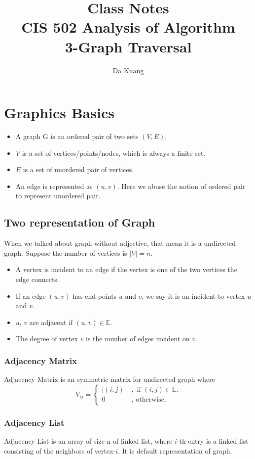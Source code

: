 \documentclass[en,hazy,blue,screen,14pt]{elegantnote}
\title{Class Notes\\CIS 502 Analysis of Algorithm\\3-Graph Traversal}
\author{Da Kuang}
\institute{University of Pennsylvania}
\date{}
\begin{document}
\maketitle
\newpage
\section{Graphics Basics}
\begin{itemize}
\item A graph G is an ordered pair of two sets $(V, E)$.
\item $V$ is a set of vertices/points/nodes, which is always a finite set.
\item $E$ is a set of unordered pair of vertices.
\item An edge is represented as $(u ,v)$. Here we abuse the notion of ordered pair to represent unordered pair.
\end{itemize}

\subsection{Two representation of Graph}
When we talked about graph without adjective, that mean it is a 
undirected graph. Suppose the number of vertices is $|V| = n$.
\begin{itemize}
 \item A vertex is incident to an edge if the vertex is one of the two vertices 
the edge connects.
\item If an edge $(u, v)$ has end points $u$ and $v$, we say it is an incident 
to vertex $u$ and $v$.
\item $u$, $v$ are adjacent if $(u, v) \in \mathbb{E}$.
\item The degree of vertex $v$ is the number of edges incident on $v$.
\end{itemize}

\subsubsection{Adjacency Matrix}
Adjacency Matrix is an symmetric matrix for undirected graph where
\[
V_{ij} = 
\begin{cases*}
 |(i,j)| & ,\text{ if $(i,j) \in \mathbb{E}$.}\\
 0  &,\text{ otherwise.}
\end{cases*}
\]
\subsubsection{Adjacency List}
Adjacency List is an array of size n of linked list, where $i$-th entry is 
a linked list consisting of the neighbors of vertex-$i$. It is default 
representation of graph.
\end{document}
